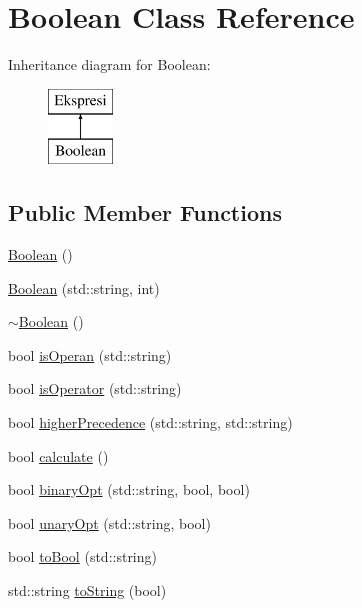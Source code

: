 \hypertarget{class_boolean}{}\section{Boolean Class Reference}
\label{class_boolean}
Inheritance diagram for Boolean\+:\begin{figure}[H]
\begin{center}
\leavevmode
\includegraphics[height=2.000000cm]{class_boolean}
\end{center}
\end{figure}
\subsection*{Public Member Functions}
\begin{DoxyCompactItemize}
\item 
\hyperlink{class_boolean_a9acbc8d83926e3900765a64a34381244}{Boolean} ()
\item 
\hyperlink{class_boolean_ae880e02386228f33f2a737cda4454961}{Boolean} (std\+::string, int)
\item 
\hyperlink{class_boolean_a025bfd19cd093dbbe9492fdab16c056b}{$\sim$\+Boolean} ()
\item 
bool \hyperlink{class_boolean_a9c5afca5ecb28f04ac727a56d646d057}{is\+Operan} (std\+::string)
\item 
bool \hyperlink{class_boolean_a37e98802c20820e8cdbbfa38232b4930}{is\+Operator} (std\+::string)
\item 
bool \hyperlink{class_boolean_a98d763cbf5a4593f5ec268bf7ccd3553}{higher\+Precedence} (std\+::string, std\+::string)
\item 
bool \hyperlink{class_boolean_afe82de6b9a08e0c8db62137a734a061f}{calculate} ()
\item 
bool \hyperlink{class_boolean_ab0b23535c2252cbc7102c75abbfe9431}{binary\+Opt} (std\+::string, bool, bool)
\item 
bool \hyperlink{class_boolean_ac71658df045b0057645eef07b1e0ca67}{unary\+Opt} (std\+::string, bool)
\item 
bool \hyperlink{class_boolean_ae90e5b45fff514752dd205f2183672cc}{to\+Bool} (std\+::string)
\item 
std\+::string \hyperlink{class_boolean_aa7847240d94a59acd0d30be5a11241f2}{to\+String} (bool)
\end{DoxyCompactItemize}
